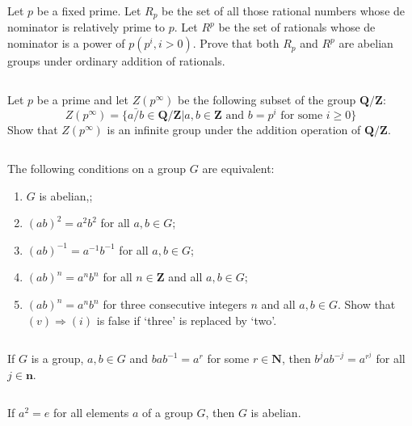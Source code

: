 $$ $$

\begin{ex}
    Let $p$ be a fixed prime. Let $R_p$ be the set of all those rational numbers whose de nominator is relatively prime to $p$. Let $R^p$ be the set of rationals whose de nominator is a power of $p (p^i, i > 0)$. Prove that both $R_p$ and $R^p$ are abelian groups under ordinary addition of rationals.
\end{ex}

$$ $$

\begin{ex}
    Let $p$ be a prime and let $Z(p^\infty)$ be the following subset of the group $\mathbf{Q}/\mathbf{Z}$:\[Z(p^\infty)=\{\bar{a/b}\in\mathbf{Q}/\mathbf{Z}| a,b \in \mathbf{Z} \text{ and } b=p^i \text{ for some }i\geq 0\}\]
    Show that $Z(p^\infty)$ is an infinite group under the addition operation of $\mathbf{Q}/\mathbf{Z}$.
\end{ex}

$$ $$

\begin{ex}
    The following conditions on a group $G$ are equivalent:
    \begin{enumerate}
        \item $G$ is abelian,;
        \item $(ab)^2=a^{2}b^{2}$ for all $a,b\in G$;
        \item $(ab)^{-1}=a^{-1}b^{-1}$ for all $a,b \in G$;
        \item $(ab)^{n}=a^{n}b^{n}$ for all $n\in \mathbf{Z}$ and all $a,b \in G$;
        \item $(ab)^{n}=a^{n}b^{n}$ for three consecutive integers $n$ and all $a,b \in G$. Show that $(v)\Rightarrow (i)$ is false if `three' is replaced by `two'.
    \end{enumerate}
\end{ex}

$$ $$

\begin{ex}
    If $G$ is a group, $a,b\in G$ and $bab^{-1}=a^{r}$ for some $r\in \mathbf{N}$, then $b^{j}ab^{-j}=a^{r^{j}}$ for all $j\in \mathbf{n}$. 
\end{ex}

$$ $$

\begin{ex}
    If $a^{2}=e$ for all elements $a$ of a group $G$, then $G$ is abelian.
\end{ex}

$$ $$

